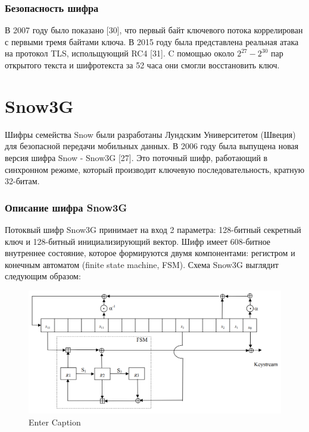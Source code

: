 \documentclass[colorthm]{./civarticle}
\begin{document}
\subsubsection{Безопасность шифра}
В 2007 году было показано [30], что первый байт ключевого потока коррелирован с первыми тремя байтами ключа. В 2015 году была представлена реальная атака на протокол TLS, испольщующий RC4 [31]. C помощью около $2^{27}-2^{30}$ пар открытого текста и шифротекста за 52 часа они смогли восстановить ключ.

\section{Snow3G}

Шифры семейства Snow были разработаны Лундским Университетом (Швеция) для безопасной передачи мобильных данных. В 2006 году была выпущена новая версия шифра Snow - Snow3G [27]. Это поточный шифр, работающий в синхронном режиме, который производит ключевую последовательность, кратную 32-битам.

\subsubsection{Описание шифра Snow3G}

Потоквый шифр Snow3G принимает на вход 2 параметра: 128-битный секретный ключ и 128-битный инициализирующий вектор. Шифр имеет 608-битное внутреннее состояние, которое формируются двумя компонентами: регистром и конечным автоматом (finite state machine, FSM). Схема Snow3G выглядит следующим образом:

\begin{figure}[H]
    \centering
    \includegraphics[width=1\linewidth]{Снимок экрана 2024-01-12 141248.png}
    \caption{Enter Caption}
    \label{fig:enter-label}
\end{figure}
\end{document}
